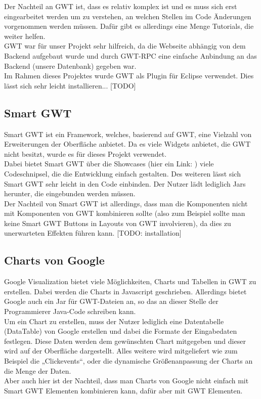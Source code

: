 \documentclass[12pt,a4paper,twoside]{article}
\begin{document}
Der Nachteil an GWT ist, dass es relativ komplex ist und es muss sich erst eingearbeitet werden um zu verstehen, an welchen Stellen im Code Änderungen vorgenommen werden müssen. Dafür gibt es allerdings eine Menge Tutorials, die weiter helfen. \\
GWT war für unser Projekt sehr hilfreich, da die Webseite abhängig von dem Backend aufgebaut wurde und durch GWT-RPC eine einfache Anbindung an das Backend (unsere Datenbank) gegeben war. \\
\newline
Im Rahmen dieses Projektes wurde GWT als Plugin für Eclipse verwendet. Dies lässt sich sehr leicht installieren... [TODO]

\subsection{Smart GWT}
Smart GWT ist ein Framework, welches, basierend auf GWT, eine Vielzahl von Erweiterungen der Oberfläche anbietet. Da es viele Widgets anbietet, die GWT nicht besitzt, wurde es für dieses Projekt verwendet.\\
Dabei bietet Smart GWT über die Showcases (hier ein Link: \cite{smartgwt}) viele Codeschnipsel, die die Entwicklung  einfach gestalten. Des weiteren lässt sich Smart GWT sehr leicht in den Code einbinden. Der Nutzer lädt lediglich Jars herunter, die eingebunden werden müssen. \\
Der Nachteil von Smart GWT ist allerdings, dass man die Komponenten nicht mit Komponenten von GWT kombinieren sollte (also zum Beispiel sollte man keine Smart GWT Buttons in Layouts von GWT involvieren), da dies zu unerwarteten Effekten führen kann.
[TODO: installation]

\subsection{Charts von Google}
Google Visualization bietet viele Möglichkeiten, Charts und Tabellen in GWT zu erstellen. Dabei werden die Charts in Javascript geschrieben. Allerdings bietet Google auch ein Jar für GWT-Dateien an, so das an dieser Stelle der Programmierer Java-Code schreiben kann. \\
Um ein Chart zu erstellen, muss der Nutzer lediglich eine Datentabelle (DataTable) von Google erstellen und dabei die Formate der Eingabedaten festlegen. Diese Daten werden dem gewünschten Chart mitgegeben und dieser wird auf der Oberfläche dargestellt. Alles weitere wird mitgeliefert wie zum Beispiel die „Clickevents“, oder die dynamische Größenanpassung der Charts an die Menge der Daten.\\
Aber auch hier ist der Nachteil, dass man Charts von Google nicht einfach mit Smart GWT Elementen kombinieren kann, dafür aber mit GWT Elementen.
\end{document}
